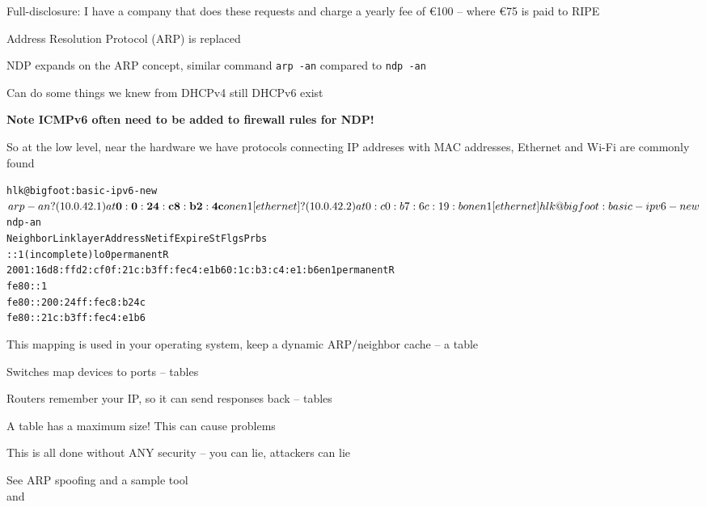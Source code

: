 \documentclass[Screen16to9,17pt]{foils}
\begin{document}
Full-disclosure: I have a company that does these requests and charge a yearly fee of €100 -- where €75 is paid to RIPE





\begin{list1}
\item Address Resolution Protocol (ARP) is replaced
\item NDP expands on the ARP concept, similar command \verb+arp -an+ compared to \verb+ndp -an+
\item Can do some things we knew from DHCPv4 still DHCPv6 exist
\item {\bf Note ICMPv6 often need to be added to firewall rules for NDP!} {\myalert}
\end{list1}


So at the low level, near the hardware we have protocols connecting IP addreses with MAC addresses, Ethernet and Wi-Fi are commonly found

\begin{alltt}
\small
hlk@bigfoot:basic-ipv6-new$ arp -an
? (10.0.42.1) at{\bf 0:0:24:c8:b2:4c} on en1 [ethernet]
? (10.0.42.2) at 0:c0:b7:6c:19:b on en1 [ethernet]

hlk@bigfoot:basic-ipv6-new$ ndp -an
Neighbor                      Linklayer Address  Netif Expire    St Flgs Prbs
::1                           (incomplete)         lo0 permanent R
2001:16d8:ffd2:cf0f:21c:b3ff:fec4:e1b6 0:1c:b3:c4:e1:b6 en1 permanent R
fe80::1%
fe80::200:24ff:fec8:b24c%
fe80::21c:b3ff:fec4:e1b6%
\end{alltt}


\begin{list2}
\item This mapping is used in your operating system, keep a dynamic ARP/neighbor cache -- a table
\item Switches map devices to ports -- tables
\item Routers remember your IP, so it can send responses back -- tables
\item A table has a maximum size! This can cause problems {\myalert}
\item This is all done without ANY security -- you can lie, attackers can lie
\item See ARP spoofing and a sample tool  \\
and 
\end{list2}
\end{document}

